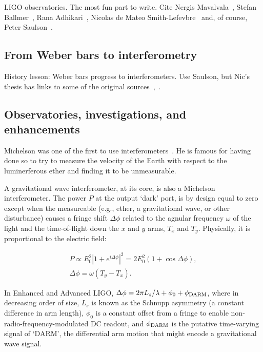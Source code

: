         LIGO observatories. The most fun part to write. Cite Nergis Mavalvala~\cite{MavalvalaThesis}, Stefan Ballmer~\cite{BallmerThesis}, Rana Adhikari~\cite{AdhikariThesis}, Nicolas de Mateo Smith-Lefevbre~\cite{SmithThesis} and, of course, Peter Saulson~\cite{Saulson}.

        \subsection{From Weber bars to interferometry}
        \label{bars_to_interferometry}

            History lesson: Weber bars progress to interferometers. Use Saulson, but Nic's thesis has links to some of the original sources~\cite{Saulson},~\cite{SmithThesis}.           

        \subsection{Observatories, investigations, and enhancements}
        \label{methods}

		Michelson was one of the first to use interferometers~\cite{michelson}. He is famous for having done so to try to measure the velocity of the Earth with respect to the luminerferous ether and finding it to be unmeasurable.

A gravitational wave interferometer, at its core, is also a Michelson interferometer. 
The power $P$ at the output `dark' port, is by design equal to zero except when the measureable (e.g., ether, a gravitational wave, or other disturbance) causes a fringe shift $\Delta \phi$ related to the agnular frequency $\omega$ of the light and the time-of-flight down the $x$ and $y$ arms, $T_x$ and $T_y$. 
Physically, it is proportional to the electric field: 

\begin{eqnarray}
P \propto E_0^2 \left| 1 + e^{i \Delta \phi}\right|^2 = 2 E_0^2 (1 + \cos \Delta \phi), \\
\Delta \phi = \omega (T_y - T_x).
\end{eqnarray}

In Enhanced and Advanced LIGO, $\Delta \phi = 2\pi L_s /\lambda + \phi_0 + \phi_{\textup{DARM}} $, where in decreasing order of size, $L_s$ is known as the Schnupp asymmetry (a constant difference in arm length), $\phi_0$ is a constant offset from a fringe to enable non-radio-frequency-modulated DC readout, and $\phi_{\textup{DARM}}$ is the putative time-varying signal of `DARM', the differential arm motion that might encode a gravitational wave signal. 

